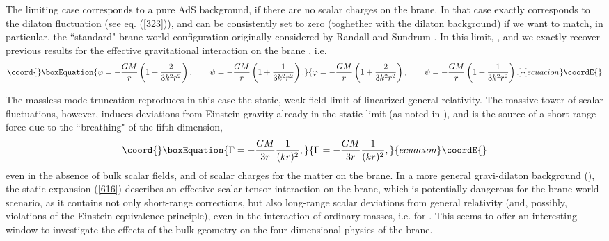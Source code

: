 \documentclass[a4paper,12pt]{article}
\begin{document}
The limiting case \coordHE{} corresponds to a pure AdS\coordHE{}
background, if there are no scalar charges on the brane. In that
case \coordHE{} exactly corresponds to the dilaton fluctuation
\myHighlight{$\chi$}\coordHE{} (see eq. (\ref{323})), and can be consistently set to zero
(toghether with the dilaton background) if we want to match, in
particular, the ``standard" brane-world configuration originally
considered by Randall and Sundrum \cite{RS2}. In this limit,
\coordHE{}, and we exactly recover previous results for the
effective gravitational interaction on the brane \cite{27a}, i.e.
\begin{equation}\coord{}\boxEquation{ \varphi= -{GM\over r} \left(1+ {2\over 3
k^2r^2}\right), ~~~~~~ \psi= -{GM\over r} \left(1+ {1\over 3
k^2r^2}\right). \label{617}
}{ \varphi= -{GM\over r} \left(1+ {2\over 3
k^2r^2}\right), ~~~~~~ \psi= -{GM\over r} \left(1+ {1\over 3
k^2r^2}\right). }{ecuacion}\coordE{}\end{equation}

The massless-mode  truncation reproduces in this case the static,
weak field limit of linearized  general relativity. The massive
tower of scalar fluctuations, however, induces deviations from
Einstein gravity already in the static limit (as noted in
\cite{27a}), and is the source of a short-range force due to the
``breathing" of the fifth dimension,
\begin{equation}\coord{}\boxEquation{ \Gamma= - {GM\over 3 r}{1\over (kr)^2}, \label{618} }{ \Gamma= - {GM\over 3 r}{1\over (kr)^2}, }{ecuacion}\coordE{}\end{equation} even
in the absence of bulk scalar fields, and of scalar charges  for
the matter  on the brane.
In a more general gravi-dilaton background (\coordHE{}),
the static expansion (\ref{616}) describes an effective
scalar-tensor interaction on the brane, which is potentially
dangerous for the brane-world scenario, as it contains not only
short-range corrections, but also long-range scalar deviations
from general relativity (and, possibly, violations of the Einstein
equivalence principle), even in the interaction of ordinary
masses, i.e. for \coordHE{}. This seems to offer an interesting window
to investigate the effects of the bulk geometry on the
four-dimensional  physics of the brane.
\end{document}
